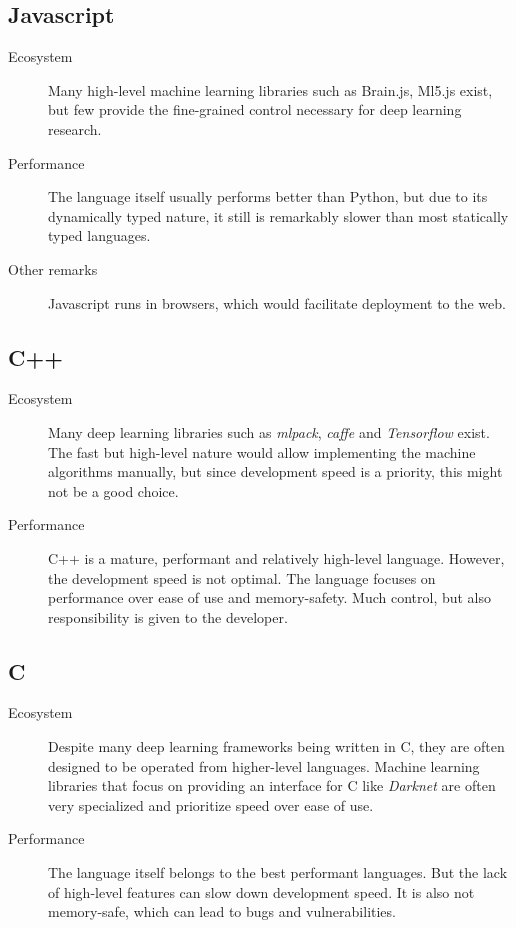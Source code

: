 \documentclass[12pt, a4paper, titlepage]{report}
\begin{document}
{
   \center
   \subsection*{Javascript}
}
\begin{description}
   \item[Ecosystem] Many high-level machine learning libraries such as Brain.js, Ml5.js exist, but few provide the fine-grained control necessary for deep learning research.
   \item[Performance] The language itself usually performs better than Python, but due to its dynamically typed nature, it still is remarkably slower than most statically typed languages.
   \item[Other remarks] Javascript runs in browsers, which would facilitate deployment to the web.
\end{description}

{
   \center
   \subsection*{C++}
}
\begin{description}
   \item[Ecosystem] Many deep learning libraries such as \emph{mlpack}, \emph{caffe} and \emph{Tensorflow} exist. The fast but high-level nature would allow implementing the machine algorithms manually, but since development speed is a priority, this might not be a good choice.
   \item[Performance] C++ is a mature, performant and relatively high-level language. However, the development speed is not optimal. The language focuses on performance over ease of use and memory-safety. Much control, but also responsibility is given to the developer.
\end{description}

{
   \center
   \subsection*{C}
}
\begin{description}
   \item[Ecosystem] Despite many deep learning frameworks being written in C, they are often designed to be operated from higher-level languages. Machine learning libraries that focus on providing an interface for C like \emph{Darknet} are often very specialized and prioritize speed over ease of use.
   \item[Performance] The language itself belongs to the best performant languages. But the lack of high-level features can slow down development speed. It is also not memory-safe, which can lead to bugs and vulnerabilities.
\end{description}
\end{document}
